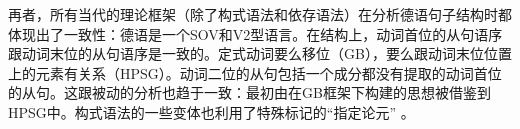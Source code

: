 再者，所有当代的理论框架（除了构式语法和依存语法）在分析德语句子结构时都体现出了一致性：德语是一个SOV和V2型语言。在结构上，动词首位的从句语序跟动词末位的从句语序是一致的。定式动词要么移位（GB），要么跟动词末位位置上的元素有关系（HPSG）。动词二位的从句包括一个成分都没有提取的动词首位的从句。这跟被动的分析也趋于一致：最初由\citet{Haider84b,Haider85b,Haider86}在GB框架下构建的思想被借鉴到HPSG中。构式语法的一些变体也利用了特殊标记的“指定论元” \citep[--57]{MR2001a}。

